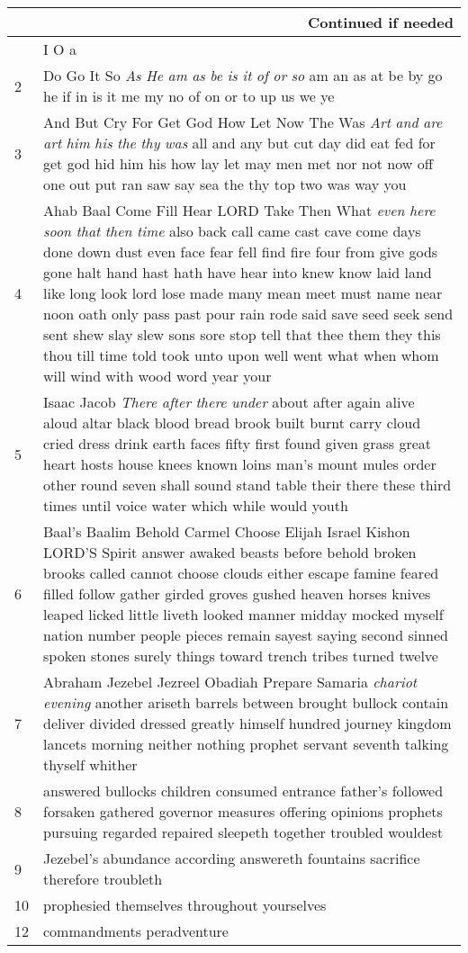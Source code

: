 \begin{center}
\begin{longtable}{p{0.4in}|p{3.6in}}
\hline \multicolumn{2}{|r|}{{Continued if needed}} \\ \hline
\endfoot 
1 & I O a \\ \hline
2 & Do Go It So \emph{As} \emph{He} \emph{am} \emph{as} \emph{be} \emph{is} \emph{it} \emph{of} \emph{or} \emph{so} am an as at be by go he if in is it me my no of on or to up us we ye \\ \hline
3 & And But Cry For Get God How Let Now The Was \emph{Art} \emph{and} \emph{are} \emph{art} \emph{him} \emph{his} \emph{the} \emph{thy} \emph{was} all and any but cut day did eat fed for get god hid him his how lay let may men met nor not now off one out put ran saw say sea the thy top two was way you \\ \hline
4 & Ahab Baal Come Fill Hear LORD Take Then What \emph{even} \emph{here} \emph{soon} \emph{that} \emph{then} \emph{time} also back call came cast cave come days done down dust even face fear fell find fire four from give gods gone halt hand hast hath have hear into knew know laid land like long look lord lose made many mean meet must name near noon oath only pass past pour rain rode said save seed seek send sent shew slay slew sons sore stop tell that thee them they this thou till time told took unto upon well went what when whom will wind with wood word year your \\ \hline
5 & Isaac Jacob \emph{There} \emph{after} \emph{there} \emph{under} about after again alive aloud altar black blood bread brook built burnt carry cloud cried dress drink earth faces fifty first found given grass great heart hosts house knees known loins man's mount mules order other round seven shall sound stand table their there these third times until voice water which while would youth \\ \hline
6 & Baal's Baalim Behold Carmel Choose Elijah Israel Kishon LORD'S Spirit answer awaked beasts before behold broken brooks called cannot choose clouds either escape famine feared filled follow gather girded groves gushed heaven horses knives leaped licked little liveth looked manner midday mocked myself nation number people pieces remain sayest saying second sinned spoken stones surely things toward trench tribes turned twelve \\ \hline
7 & Abraham Jezebel Jezreel Obadiah Prepare Samaria \emph{chariot} \emph{evening} another ariseth barrels between brought bullock contain deliver divided dressed greatly himself hundred journey kingdom lancets morning neither nothing prophet servant seventh talking thyself whither \\ \hline
8 & answered bullocks children consumed entrance father's followed forsaken gathered governor measures offering opinions prophets pursuing regarded repaired sleepeth together troubled wouldest \\ \hline
9 & Jezebel's abundance according answereth fountains sacrifice therefore troubleth \\ \hline
10 & prophesied themselves throughout yourselves \\ \hline
12 & commandments peradventure \\ \hline




\end{longtable}
\end{center}
